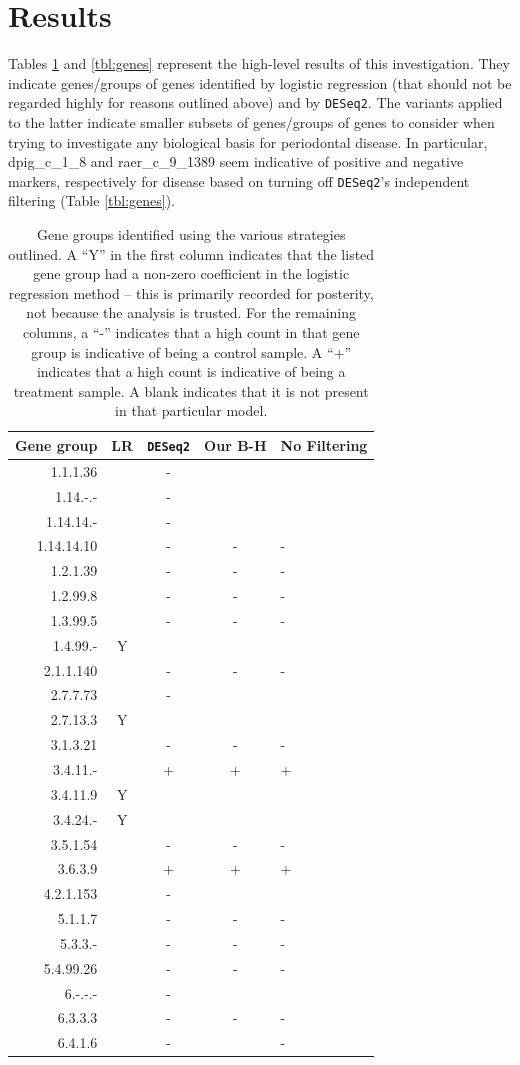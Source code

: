\documentclass{article}
\begin{document}
\section{Results}
Tables \ref{tbl:groups} and \ref{tbl:genes} represent the high-level results of this investigation. They indicate
genes/groups of genes identified by logistic regression (that should not be regarded highly for reasons outlined 
above) and by \texttt{DESeq2}. The variants applied to the latter indicate smaller subsets of genes/groups of genes
to consider when trying to investigate any biological basis for periodontal disease. In particular,
dpig\_c\_1\_8  and raer\_c\_9\_1389 seem indicative of positive and negative markers, respectively for disease based
on turning off \texttt{DESeq2}'s independent filtering (Table \ref{tbl:genes}).

\begin{table}[h]
\begin{center}
\begin{tabular}{r|cccl}
Gene group & LR & \texttt{DESeq2} & Our B-H & No Filtering\\
\hline
1.1.1.36 & & - & & \\
1.14.-.-   & & - & &\\
1.14.14.- & & - & & \\
1.14.14.10& & - & -&- \\
1.2.1.39& & - & -& -\\
1.2.99.8& & - & -& -\\
1.3.99.5& & - & -& -\\
1.4.99.-  & Y \\
2.1.1.140& & - &- &- \\
2.7.7.73& & - & & \\
2.7.13.3 & Y \\
3.1.3.21& & - & -& -\\
3.4.11.-& & + & +& +\\
3.4.11.9 & Y \\
3.4.24.-  & Y\\
3.5.1.54& & - & -& -\\
3.6.3.9& & + &+& +\\
4.2.1.153& & - & & \\
5.1.1.7& & - & -& -\\
5.3.3.-& & - &- & -\\
5.4.99.26& & - & -& -\\
6.-.-.-& & - & & \\
6.3.3.3& & - &- &- \\
6.4.1.6& & - & &- \\
\end{tabular}
\caption{\label{tbl:groups}Gene groups identified using the various strategies outlined. A ``Y'' in the first column
indicates that the listed gene group had a non-zero coefficient in the logistic regression method -- this is primarily
recorded for posterity, not because the analysis is trusted. For the remaining columns, a ``-'' indicates that
a high count in that gene group is indicative of being a control sample. A ``+'' indicates that a high count is indicative
of being a treatment sample. A blank indicates that it is not present in that particular model.}
\end{center}
\end{table}
\end{document}
